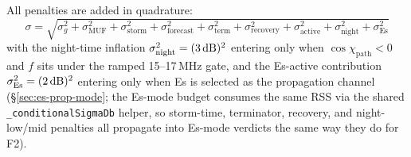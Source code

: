 \documentclass[11pt,a4paper]{article}
\newcommand{\SI}[2]{#1\,\text{#2}}
\newcommand{\dB}{\text{dB}}
\begin{document}
All penalties are added in quadrature:
\begin{equation*}
\sigma = \sqrt{\sigma_g^2 + \sigma_{\text{MUF}}^2 + \sigma_{\text{storm}}^2
  + \sigma_{\text{forecast}}^2 + \sigma_{\text{term}}^2 +
  \sigma_{\text{recovery}}^2 + \sigma_{\text{active}}^2 +
  \sigma_{\text{night}}^2 +
  \sigma_{\text{Es}}^2}
\end{equation*}
with the night-time inflation
$\sigma_{\text{night}}^2 = (\SI{3}{\dB})^2$ entering only when
$\cos\chi_{\text{path}} < 0$ and $f$ sits under the ramped
15--17\,MHz gate, and the
Es-active contribution $\sigma_{\text{Es}}^2 = (\SI{2}{\dB})^2$
entering only when Es is selected as the propagation channel
(\S\ref{sec:es-prop-mode}; the Es-mode budget consumes the same
RSS via the shared \texttt{\_conditionalSigmaDb} helper, so
storm-time, terminator, recovery, and night-low/mid penalties
all propagate into Es-mode verdicts the same way they do for
F2).
\end{document}

